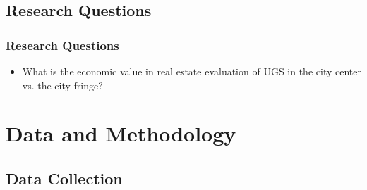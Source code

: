 \documentclass{beamer}
\begin{document}
\subsection{Research Questions}

\begin{frame}
\frametitle{Research Questions}

\begin{itemize}
    \item What is the economic value in real estate evaluation of UGS in the city center vs. the city fringe?
\end{itemize}

\end{frame}

\section{Data and Methodology}
\subsection{Data Collection}
\end{document}
